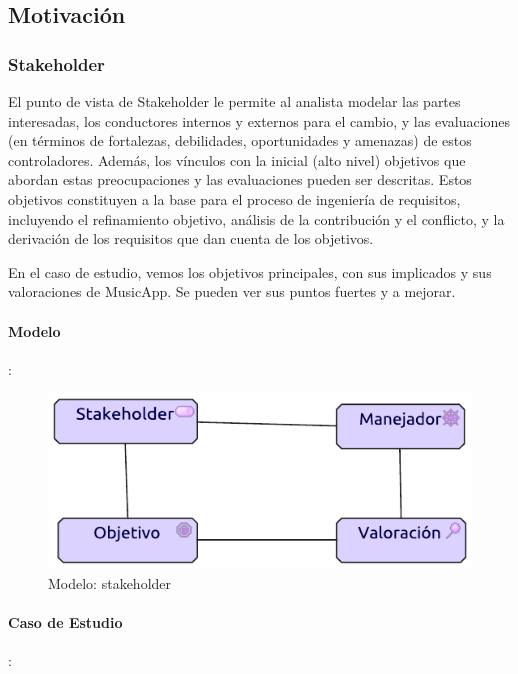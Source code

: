 \subsection{Motivación}
\subsubsection{Stakeholder}
El punto de vista de Stakeholder le permite al analista modelar las partes interesadas, los conductores internos y externos para el cambio, y las evaluaciones (en términos de fortalezas, debilidades, oportunidades y amenazas) de estos controladores. Además, los vínculos con la inicial (alto nivel) objetivos que abordan estas preocupaciones y las evaluaciones pueden ser descritas. Estos objetivos constituyen a la base para el proceso de ingeniería de requisitos, incluyendo el refinamiento objetivo, análisis de la contribución y el conflicto, y la derivación de los requisitos que dan cuenta de los objetivos.  \vspace{\baselineskip}

En el caso de estudio, vemos los objetivos principales, con sus implicados y sus valoraciones de MusicApp. Se pueden ver sus puntos fuertes y a mejorar.

\newpage
\paragraph{Modelo}:
\begin{figure}[h!]
	\centering
	\includegraphics[width=0.6\linewidth]{Desarrollo/ArquitecturaEmpresarial/Motivacion/imgs/stakeholderMetamodelo.pdf}
	\caption{Modelo: stakeholder}
\end{figure}
\paragraph{Caso de Estudio}:

